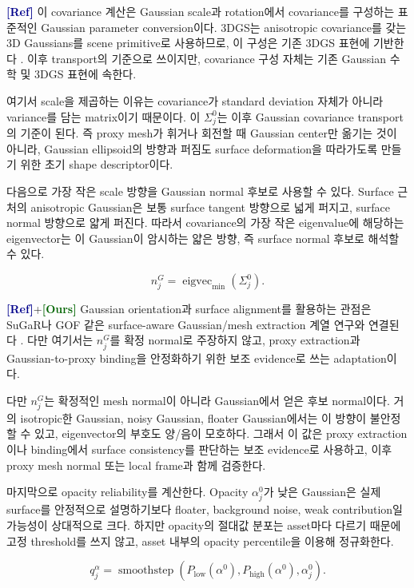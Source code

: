 \documentclass[11pt,a4paper]{article}
\newcommand{\smoothstep}{\operatorname{smoothstep}}
\newcommand{\refbased}{\textcolor{darkblue}{\textbf{[Ref]}}}
\newcommand{\ours}{\textcolor{darkgreen}{\textbf{[Ours]}}}
\begin{document}
\noindent\refbased\;
이 covariance 계산은 Gaussian scale과 rotation에서 covariance를 구성하는 표준적인 Gaussian parameter conversion이다.
3DGS는 anisotropic covariance를 갖는 3D Gaussians를 scene primitive로 사용하므로, 이 구성은 기존 3DGS 표현에 기반한다 \cite{kerbl2023gaussian}.
이후 transport의 기준으로 쓰이지만, covariance 구성 자체는 기존 Gaussian 수학 및 3DGS 표현에 속한다.

여기서 scale을 제곱하는 이유는 covariance가 standard deviation 자체가 아니라 variance를 담는 matrix이기 때문이다.
이 $\Sigma_j^0$는 이후 Gaussian covariance transport의 기준이 된다.
즉 proxy mesh가 휘거나 회전할 때 Gaussian center만 옮기는 것이 아니라, Gaussian ellipsoid의 방향과 퍼짐도 surface deformation을 따라가도록 만들기 위한 초기 shape descriptor이다.

다음으로 가장 작은 scale 방향을 Gaussian normal 후보로 사용할 수 있다.
Surface 근처의 anisotropic Gaussian은 보통 surface tangent 방향으로 넓게 퍼지고, surface normal 방향으로 얇게 퍼진다.
따라서 covariance의 가장 작은 eigenvalue에 해당하는 eigenvector는 이 Gaussian이 암시하는 얇은 방향, 즉 surface normal 후보로 해석할 수 있다.

\begin{equation}
n_j^G=\operatorname{eigvec}_{\min}(\Sigma_j^0).
\end{equation}

\noindent\refbased\;+\;\ours\;
Gaussian orientation과 surface alignment를 활용하는 관점은 SuGaR나 GOF 같은 surface-aware Gaussian/mesh extraction 계열 연구와 연결된다 \cite{guedon2024sugar,yu2024gof}.
다만 여기서는 $n_j^G$를 확정 normal로 주장하지 않고, proxy extraction과 Gaussian-to-proxy binding을 안정화하기 위한 보조 evidence로 쓰는 adaptation이다.

다만 $n_j^G$는 확정적인 mesh normal이 아니라 Gaussian에서 얻은 후보 normal이다.
거의 isotropic한 Gaussian, noisy Gaussian, floater Gaussian에서는 이 방향이 불안정할 수 있고, eigenvector의 부호도 양/음이 모호하다.
그래서 이 값은 proxy extraction이나 binding에서 surface consistency를 판단하는 보조 evidence로 사용하고, 이후 proxy mesh normal 또는 local frame과 함께 검증한다.

마지막으로 opacity reliability를 계산한다.
Opacity $\alpha_j^0$가 낮은 Gaussian은 실제 surface를 안정적으로 설명하기보다 floater, background noise, weak contribution일 가능성이 상대적으로 크다.
하지만 opacity의 절대값 분포는 asset마다 다르기 때문에 고정 threshold를 쓰지 않고, asset 내부의 opacity percentile을 이용해 정규화한다.

\begin{equation}
q_j^\alpha=\smoothstep(P_{\mathrm{low}}(\alpha^0),P_{\mathrm{high}}(\alpha^0),\alpha_j^0).
\end{equation}
\end{document}

